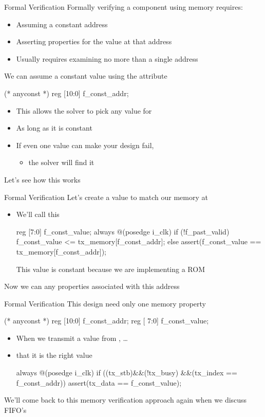 \documentclass[style=gt,mode=present,paper=screen]{powerdot}
\begin{document}
\begin{slide}[method=direct]{Formal Verification}
Formally verifying a component using memory requires:
\begin{itemize}
\item Assuming a constant address
\item Asserting properties for the value at that address
\item Usually requires examining no more than a single address
\end{itemize}
We can assume a constant value using the  attribute
\begin{zformal}
(* anyconst *) reg [10:0] f_const_addr;
\end{zformal}
\begin{itemize}
\item This allows the solver to pick any value for 
\item As long as it is constant
\item If even one value can make your design fail,
	\begin{itemize}
	\item[] the solver will find it
	\end{itemize}
\end{itemize}
Let's see how this works
\end{slide}
%
%
\begin{slide}[bm=,toc=,method=direct]{Formal Verification}
Let's create a value to match our memory at
\begin{itemize}
\begin{zformal}
(* anyconst *) reg [10:0] f_const_addr;
\end{zformal}
\item We'll call this 
\begin{zformal}
reg [7:0] f_const_value;
always @(posedge i_clk)
if (!f_past_valid)
    f_const_value <= tx_memory[f_const_addr];
else
    assert(f_const_value
	== tx_memory[f_const_addr]);
\end{zformal}
This value is constant because we are implementing a ROM
\end{itemize}
Now we can  any properties associated with this address
\end{slide}
%
%
\begin{slide}[bm=,toc=,method=direct]{Formal Verification}
This design need only  one memory property
\begin{zformal}
(* anyconst *) reg [10:0] f_const_addr;
	       reg [ 7:0] f_const_value;
\end{zformal}
\begin{itemize}
\item When we transmit a value from , \ldots
\item {} that it is the right value
\begin{zformal}
always @(posedge i_clk)
if ((tx_stb)&&(!tx_busy)
	    &&(tx_index == f_const_addr))
	assert(tx_data == f_const_value);
\end{zformal}
\end{itemize}
We'll come back to this memory verification approach
  again when we discuss FIFO's
\end{slide}
\end{document}
